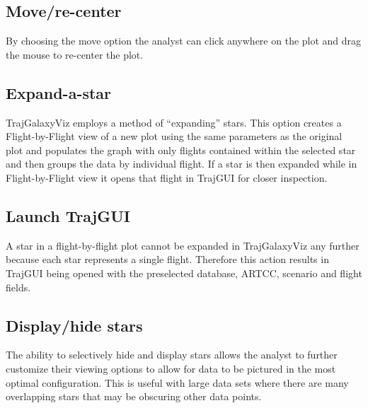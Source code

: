 \documentclass[]{article}
\begin{document}
\subsection{Move/re-center}
\label{moveRecenter}
By choosing the move option the analyst can click anywhere on the plot and drag the mouse to re-center the plot.

\subsection{Expand-a-star}
\label{expandAStar}
TrajGalaxyViz employs a method of “expanding” stars. This option creates a Flight-by-Flight view of a new plot using the same parameters as the original plot and populates the graph with only flights contained within the selected star and then groups the data by individual flight. If a star is then expanded while in Flight-by-Flight view it opens that flight in TrajGUI for closer inspection.

\subsection{Launch TrajGUI}
\label{launchTrajGUI}
A star in a flight-by-flight plot cannot be expanded in TrajGalaxyViz any further because each star represents a single flight. Therefore this action results in TrajGUI being opened with the preselected database, ARTCC, scenario and flight fields.

\subsection{Display/hide stars}
\label{displayHideStars}
The ability to selectively hide and display stars allows the analyst to further customize their viewing options to allow for data to be pictured in the most optimal configuration. This is useful with large data sets where there are many overlapping stars that may be obscuring other data points.
\end{document}
